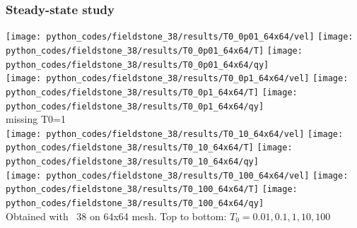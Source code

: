 \newpage
\subsubsection*{Steady-state study}


\begin{center}
\texttt{[image: python\_codes/fieldstone\_38/results/T0\_0p01\_64x64/vel]}
\texttt{[image: python\_codes/fieldstone\_38/results/T0\_0p01\_64x64/T]}
\texttt{[image: python\_codes/fieldstone\_38/results/T0\_0p01\_64x64/qy]}\\
\texttt{[image: python\_codes/fieldstone\_38/results/T0\_0p1\_64x64/vel]}
\texttt{[image: python\_codes/fieldstone\_38/results/T0\_0p1\_64x64/T]}
\texttt{[image: python\_codes/fieldstone\_38/results/T0\_0p1\_64x64/qy]}\\
missing T0=1 \\
\texttt{[image: python\_codes/fieldstone\_38/results/T0\_10\_64x64/vel]}
\texttt{[image: python\_codes/fieldstone\_38/results/T0\_10\_64x64/T]}
\texttt{[image: python\_codes/fieldstone\_38/results/T0\_10\_64x64/qy]}\\
\texttt{[image: python\_codes/fieldstone\_38/results/T0\_100\_64x64/vel]}
\texttt{[image: python\_codes/fieldstone\_38/results/T0\_100\_64x64/T]}
\texttt{[image: python\_codes/fieldstone\_38/results/T0\_100\_64x64/qy]}\\
{\captionfont Obtained with \stone~38 on 64x64 mesh. 
Top to bottom: $T_0=0.01,0.1,1,10,100$}
\end{center}

